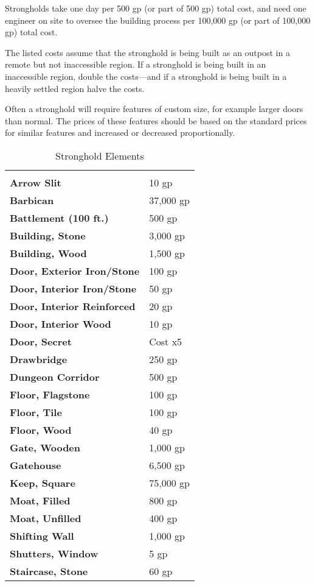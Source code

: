 \begin{multicols*}{2}
Strongholds take one day per 500 gp (or part of 500 gp) total cost, and need one engineer on site to oversee the building process per 100,000 gp (or part of 100,000 gp) total cost.

The listed costs assume that the stronghold is being built as an outpost in a remote but not inaccessible region. If a stronghold is being built in an inaccessible region, double the costs—and if a stronghold is being built in a heavily settled region halve the costs.

Often a stronghold will require features of custom size, for example larger doors than normal. The prices of these features should be based on the standard prices for similar features and increased or decreased proportionally.

\begin {table}[H]
  \caption{Stronghold Elements}\label{tab:Stronghold Elements}
  \begin{tabularx}{\columnwidth}{>{\bfseries}YY}
	 & \\
	Arrow Slit & 10 gp\\
	Barbican & 37,000 gp\\
	Battlement (100 ft.) & 500 gp\\
	Building, Stone & 3,000 gp\\
	Building, Wood & 1,500 gp\\
	Door, Exterior Iron/Stone & 100 gp\\
	Door, Interior Iron/Stone & 50 gp\\
	Door, Interior Reinforced & 20 gp\\
	Door, Interior Wood & 10 gp\\
	Door, Secret & Cost x5\\
	Drawbridge & 250 gp\\
	Dungeon Corridor & 500 gp\\
	Floor, Flagstone & 100 gp\\
	Floor, Tile & 100 gp\\
	Floor, Wood & 40 gp\\
	Gate, Wooden & 1,000 gp\\
	Gatehouse & 6,500 gp\\
	Keep, Square & 75,000 gp\\
	Moat, Filled & 800 gp\\
	Moat, Unfilled & 400 gp\\
	Shifting Wall & 1,000 gp\\
	Shutters, Window & 5 gp\\
	Staircase, Stone & 60 gp\\

\end{tabularx}
\end{table}
\end{multicols*}
